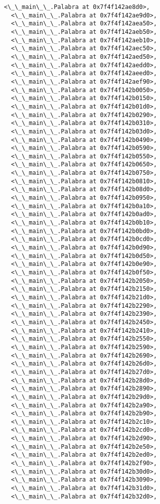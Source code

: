 \documentclass[12pt,a4paper,table]{article}
\begin{document}
\begin{tcolorbox}[breakable, size=fbox, boxrule=.5pt, pad at break*=1mm, opacityfill=0]
\begin{Verbatim}[commandchars=\\\{\}]
  <\_\_main\_\_.Palabra at 0x7f4f142ae8d0>,
  <\_\_main\_\_.Palabra at 0x7f4f142ae9d0>,
  <\_\_main\_\_.Palabra at 0x7f4f142aea50>,
  <\_\_main\_\_.Palabra at 0x7f4f142aeb50>,
  <\_\_main\_\_.Palabra at 0x7f4f142aeb10>,
  <\_\_main\_\_.Palabra at 0x7f4f142aec50>,
  <\_\_main\_\_.Palabra at 0x7f4f142aed50>,
  <\_\_main\_\_.Palabra at 0x7f4f142aedd0>,
  <\_\_main\_\_.Palabra at 0x7f4f142aeed0>,
  <\_\_main\_\_.Palabra at 0x7f4f142aef90>,
  <\_\_main\_\_.Palabra at 0x7f4f142b0050>,
  <\_\_main\_\_.Palabra at 0x7f4f142b0150>,
  <\_\_main\_\_.Palabra at 0x7f4f142b01d0>,
  <\_\_main\_\_.Palabra at 0x7f4f142b0290>,
  <\_\_main\_\_.Palabra at 0x7f4f142b0310>,
  <\_\_main\_\_.Palabra at 0x7f4f142b03d0>,
  <\_\_main\_\_.Palabra at 0x7f4f142b0490>,
  <\_\_main\_\_.Palabra at 0x7f4f142b0590>,
  <\_\_main\_\_.Palabra at 0x7f4f142b0550>,
  <\_\_main\_\_.Palabra at 0x7f4f142b0650>,
  <\_\_main\_\_.Palabra at 0x7f4f142b0750>,
  <\_\_main\_\_.Palabra at 0x7f4f142b0810>,
  <\_\_main\_\_.Palabra at 0x7f4f142b08d0>,
  <\_\_main\_\_.Palabra at 0x7f4f142b0950>,
  <\_\_main\_\_.Palabra at 0x7f4f142b0a10>,
  <\_\_main\_\_.Palabra at 0x7f4f142b0ad0>,
  <\_\_main\_\_.Palabra at 0x7f4f142b0b10>,
  <\_\_main\_\_.Palabra at 0x7f4f142b0bd0>,
  <\_\_main\_\_.Palabra at 0x7f4f142b0cd0>,
  <\_\_main\_\_.Palabra at 0x7f4f142b0d90>,
  <\_\_main\_\_.Palabra at 0x7f4f142b0d50>,
  <\_\_main\_\_.Palabra at 0x7f4f142b0e90>,
  <\_\_main\_\_.Palabra at 0x7f4f142b0f50>,
  <\_\_main\_\_.Palabra at 0x7f4f142b2050>,
  <\_\_main\_\_.Palabra at 0x7f4f142b2150>,
  <\_\_main\_\_.Palabra at 0x7f4f142b21d0>,
  <\_\_main\_\_.Palabra at 0x7f4f142b2290>,
  <\_\_main\_\_.Palabra at 0x7f4f142b2390>,
  <\_\_main\_\_.Palabra at 0x7f4f142b2450>,
  <\_\_main\_\_.Palabra at 0x7f4f142b2410>,
  <\_\_main\_\_.Palabra at 0x7f4f142b2550>,
  <\_\_main\_\_.Palabra at 0x7f4f142b2590>,
  <\_\_main\_\_.Palabra at 0x7f4f142b2690>,
  <\_\_main\_\_.Palabra at 0x7f4f142b26d0>,
  <\_\_main\_\_.Palabra at 0x7f4f142b27d0>,
  <\_\_main\_\_.Palabra at 0x7f4f142b28d0>,
  <\_\_main\_\_.Palabra at 0x7f4f142b2890>,
  <\_\_main\_\_.Palabra at 0x7f4f142b29d0>,
  <\_\_main\_\_.Palabra at 0x7f4f142b2a90>,
  <\_\_main\_\_.Palabra at 0x7f4f142b2b90>,
  <\_\_main\_\_.Palabra at 0x7f4f142b2c10>,
  <\_\_main\_\_.Palabra at 0x7f4f142b2cd0>,
  <\_\_main\_\_.Palabra at 0x7f4f142b2d90>,
  <\_\_main\_\_.Palabra at 0x7f4f142b2e50>,
  <\_\_main\_\_.Palabra at 0x7f4f142b2ed0>,
  <\_\_main\_\_.Palabra at 0x7f4f142b2f90>,
  <\_\_main\_\_.Palabra at 0x7f4f142b30d0>,
  <\_\_main\_\_.Palabra at 0x7f4f142b3090>,
  <\_\_main\_\_.Palabra at 0x7f4f142b31d0>,
  <\_\_main\_\_.Palabra at 0x7f4f142b32d0>,

\end{Verbatim}
\end{tcolorbox}
\end{document}

